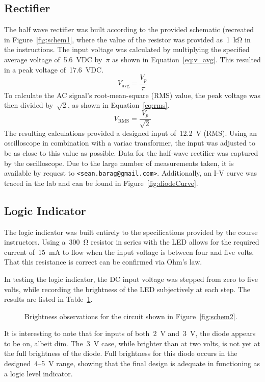 \subsection{Rectifier}
The half wave rectifier was built according to the provided schematic (recreated
in Figure~\ref{fig:schem1}, where the value of the resistor was provided
as~\SI{1}{\kilo\ohm} in the instructions.  The input voltage was calculated by
multiplying the specified average voltage of~\SI{5.6}{\volt}DC by~$\pi$ as
shown in Equation~\ref{eq:v_avg}.  This resulted in a peak voltage
of~\SI{17.6}{\volt}DC.
%
\begin{equation}
	V_\text{avg} = \frac{V_p}{\pi}
	\label{eq:v_avg}
\end{equation}
%
To calculate the AC signal's root-mean-square (RMS) value, the peak voltage was
then divided by~$\sqrt{2}$, as shown in Equation~\ref{eq:rms}.
%
\begin{equation}
	V_\text{RMS} = \frac{V_p}{\sqrt{2}}
	\label{eq:rms}
\end{equation}
%
The resulting calculations provided a designed input of~\SI{12.2}{\volt} (RMS).
Using an oscilloscope in combination with a variac transformer, the input was
adjusted to be as close to this value as possible. Data for the half-wave
rectifier was captured by the oscilloscope.  Due to the large number of
measurements taken, it is available by request to
\texttt{<sean.barag@gmail.com>}.  Additionally, an I-V curve was traced in the
lab and can be found in Figure~\ref{fig:diodeCurve}.

\subsection{Logic Indicator}
The logic indicator was built entirely to the specifications provided by the
course instructors.  Using a~\SI{300}{\ohm} resistor in series with the LED
allows for the required current of~\SI{15}{\milli\ampere} to flow when the
input voltage is between four and five volts.  That this resistance is correct
can be confirmed via Ohm's law.

In testing the logic indicator, the DC input voltage was stepped from zero to
five volts, while recording the brightness of the LED subjectively at each
step.  The results are listed in Table~\ref{tab:ckt2data}.
%
\begin{figure}[H]
	\centering
	
	\caption{Brightness observations for the circuit shown in
		Figure~\ref{fig:schem2}.}
	\label{tab:ckt2data}
\end{figure}
%
It is interesting to note that for inputs of both~\SI{2}{\volt}
and~\SI{3}{\volt}, the diode appears to be on, albeit dim.  The~\SI{3}{\volt}
case, while brighter than at two volts, is not yet at the full brightness of
the diode.  Full brightness for this diode occurs in the
designed~4--\SI{5}{\volt} range, showing that the final design is adequate in
functioning as a logic level indicator.

